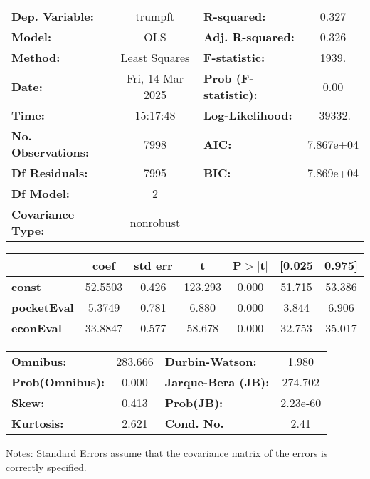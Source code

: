 \begin{center}
\begin{tabular}{lclc}
\toprule
\textbf{Dep. Variable:}    &     trumpft      & \textbf{  R-squared:         } &     0.327   \\
\textbf{Model:}            &       OLS        & \textbf{  Adj. R-squared:    } &     0.326   \\
\textbf{Method:}           &  Least Squares   & \textbf{  F-statistic:       } &     1939.   \\
\textbf{Date:}             & Fri, 14 Mar 2025 & \textbf{  Prob (F-statistic):} &     0.00    \\
\textbf{Time:}             &     15:17:48     & \textbf{  Log-Likelihood:    } &   -39332.   \\
\textbf{No. Observations:} &        7998      & \textbf{  AIC:               } & 7.867e+04   \\
\textbf{Df Residuals:}     &        7995      & \textbf{  BIC:               } & 7.869e+04   \\
\textbf{Df Model:}         &           2      & \textbf{                     } &             \\
\textbf{Covariance Type:}  &    nonrobust     & \textbf{                     } &             \\
\bottomrule
\end{tabular}
\begin{tabular}{lcccccc}
                    & \textbf{coef} & \textbf{std err} & \textbf{t} & \textbf{P$> |$t$|$} & \textbf{[0.025} & \textbf{0.975]}  \\
\midrule
\textbf{const}      &      52.5503  &        0.426     &   123.293  &         0.000        &       51.715    &       53.386     \\
\textbf{pocketEval} &       5.3749  &        0.781     &     6.880  &         0.000        &        3.844    &        6.906     \\
\textbf{econEval}   &      33.8847  &        0.577     &    58.678  &         0.000        &       32.753    &       35.017     \\
\bottomrule
\end{tabular}
\begin{tabular}{lclc}
\textbf{Omnibus:}       & 283.666 & \textbf{  Durbin-Watson:     } &    1.980  \\
\textbf{Prob(Omnibus):} &   0.000 & \textbf{  Jarque-Bera (JB):  } &  274.702  \\
\textbf{Skew:}          &   0.413 & \textbf{  Prob(JB):          } & 2.23e-60  \\
\textbf{Kurtosis:}      &   2.621 & \textbf{  Cond. No.          } &     2.41  \\
\bottomrule
\end{tabular}
\end{center}

Notes: \newline
 [1] Standard Errors assume that the covariance matrix of the errors is correctly specified.
